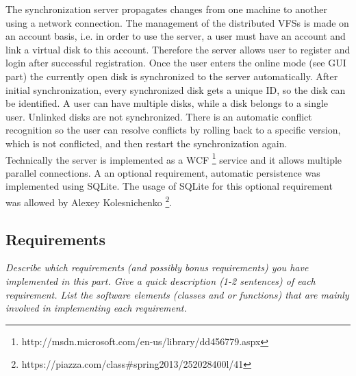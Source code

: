 \documentclass[JCDReport.tex]{subfiles}
\begin{document}
The synchronization server propagates changes from one machine to another using a network connection. The management of the distributed VFSs is made on an account basis, i.e. in order to use the server, a user must have an account and link a virtual disk to this account. Therefore the server allows user to register and login after successful registration. Once the user enters the online mode (see GUI part) the currently open disk is synchronized to the server automatically. After initial synchronization, every synchronized disk gets a unique ID, so the disk can be identified. A user can have multiple disks, while a disk belongs to a single user. Unlinked disks are not synchronized. There is an automatic conflict recognition so the user can resolve conflicts by rolling back to a specific version, which is not conflicted, and then restart the synchronization again.\\

Technically the server is implemented as a WCF \footnote{http://msdn.microsoft.com/en-us/library/dd456779.aspx} service  and it allows multiple parallel connections. A an optional requirement, automatic persistence was implemented using SQLite. The usage of SQLite for this optional requirement was allowed by Alexey Kolesnichenko \footnote{https://piazza.com/class\#spring2013/252028400l/41}.\\

\subsection{Requirements}

\emph{Describe which requirements (and possibly bonus requirements) you have implemented in this part. Give a quick description (1-2 sentences) of each requirement. List the software elements (classes and or functions) that are mainly involved in implementing each requirement.}


\end{document}
